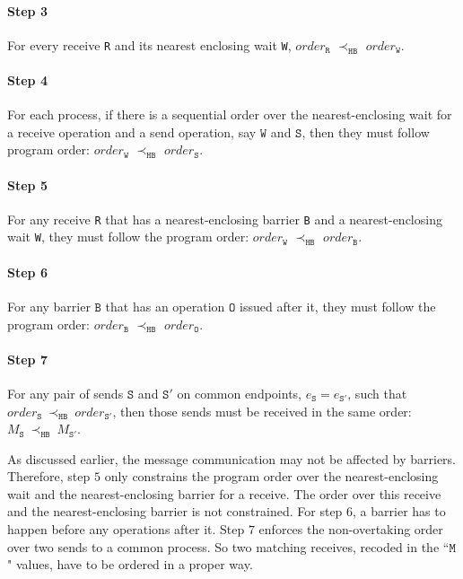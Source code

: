 \paragraph*{Step 3} For every receive \texttt{R} and its nearest
enclosing wait \texttt{W}, $\mathit{order}_\mathtt{R}$
$\prec_\mathtt{HB}$ $\mathit{order}_\mathtt{W}$.

\paragraph*{Step 4} For each process, if there is a sequential order over the nearest-enclosing wait for a receive operation and a send operation, say $\mathtt{W}$ and $\mathtt{S}$, then they must follow program order: $\mathit{order}_\mathtt{W}$
$\prec_\mathtt{HB}$ $\mathit{order}_\mathtt{S}$.

\paragraph*{Step 5} For any receive \texttt{R} that has a nearest-enclosing barrier \texttt{B} and a nearest-enclosing wait \texttt{W}, they must follow the program order:
$\mathit{order}_\mathtt{W}$ $\prec_\mathtt{HB}$ $\mathit{order}_\mathtt{B}$.

\paragraph*{Step 6} For any barrier $\mathtt{B}$ that has an operation $\mathtt{O}$ issued after it, they must follow the program order: $\mathit{order}_\mathtt{B}$
$\prec_\mathtt{HB}$ $\mathit{order}_\mathtt{O}$.

\paragraph*{Step 7} For any pair of sends $\mathtt{S}$ and
$\mathtt{S'}$ on common endpoints, $e_{\mathtt{S}}=e_{\mathtt{S'}}$,
such that
$\mathit{order}_\mathtt{S}\ \mathrm{\prec_\mathtt{HB}}\ \mathit{order}_\mathtt{S'}$,
then those sends must be received in the same order:
$M_{\mathtt{S}}\ \mathrm{\prec_{\mathtt{HB}}}\ M_{\mathtt{S'}}$.

As discussed earlier, the message communication may not be affected by barriers. Therefore, step $5$ only constrains the program order over the nearest-enclosing wait and the nearest-enclosing barrier for a receive. The order over this receive and the nearest-enclosing barrier is not constrained. For step $6$, a barrier has to happen before any operations after it. Step $7$ enforces the non-overtaking order over two sends to a common process. So two matching receives, recoded in the ``$\mathtt{M}$" values, have to be ordered in a proper way.

